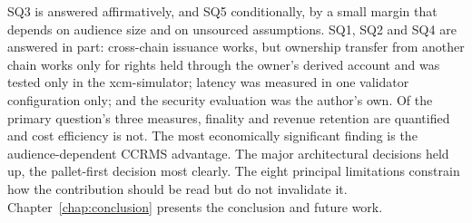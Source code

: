 SQ3 is answered affirmatively, and SQ5 conditionally, by a small margin that depends on audience size and on unsourced assumptions. SQ1, SQ2 and SQ4 are answered in part: cross-chain issuance works, but ownership transfer from another chain works only for rights held through the owner's derived account and was tested only in the xcm-simulator; latency was measured in one validator configuration only; and the security evaluation was the author's own. Of the primary question's three measures, finality and revenue retention are quantified and cost efficiency is not. The most economically significant finding is the audience-dependent CCRMS advantage. The major architectural decisions held up, the pallet-first decision most clearly. The eight principal limitations constrain how the contribution should be read but do not invalidate it. Chapter~\ref{chap:conclusion} presents the conclusion and future work.
